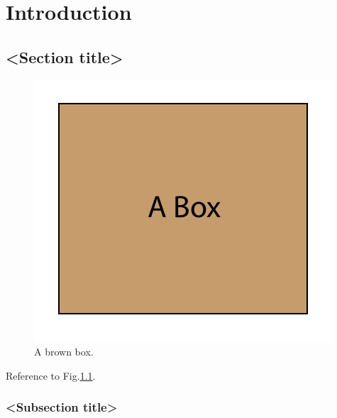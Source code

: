\chapter{Introduction}
\lipsum[5]\cite{Alling2012} %
\section{<Section title>}

\begin{figure}[t]
  \centering
  \includegraphics{figures/box}
  \caption{A brown box.}
  \label{fig:brown_box}
\end{figure}

\lipsum[1] Reference to Fig.\ref{fig:brown_box}.
\lipsum[6-10]\cite{Tholander2013,Tholander2014} %

\subsection{<Subsection title>}
\lipsum[11-13]